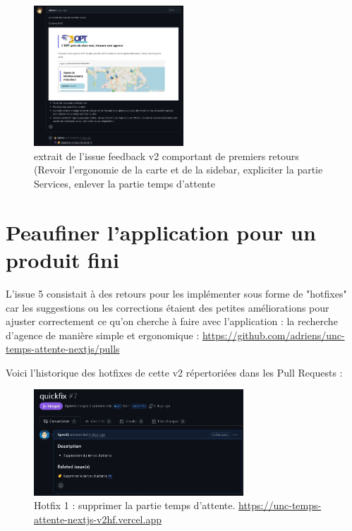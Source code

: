 \documentclass[12pt,a4paper]{report}
\begin{document}
\begin{figure}[h] %
    \centering
    \includegraphics[width=0.5\textwidth]{ressources_rapport/extrait_issue_5_2.JPG}
    \caption{extrait de l'issue feedback v2 comportant de premiers retours (Revoir l'ergonomie de la carte et de la sidebar, expliciter la partie Services, enlever la partie temps d'attente}
\end{figure}
\newpage

\section{Peaufiner l'application pour un produit fini}
L'issue 5 consistait à des retours pour les implémenter sous forme de "hotfixes" car les suggestions ou les corrections étaient des petites améliorations pour ajuster correctement ce qu'on cherche à faire avec l'application : la recherche d'agence de manière simple et ergonomique : \href{https://github.com/adriens/unc-temps-attente-nextjs/pulls}{https://github.com/adriens/unc-temps-attente-nextjs/pulls}

\vspace{1cm}
Voici l'historique des hotfixes de cette v2 répertoriées dans les Pull Requests :
\vspace{1cm}

\begin{figure}[h] %
    \centering
    \includegraphics[width=0.7\textwidth]{ressources_rapport/extrait_pr_7.JPG}
    \caption{Hotfix 1 : supprimer la partie temps d'attente. \href{https://unc-temps-attente-nextjs-v2hf.vercel.app}{https://unc-temps-attente-nextjs-v2hf.vercel.app}}
\end{figure}
\end{document}
